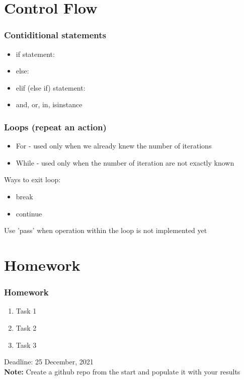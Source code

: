 \documentclass{beamer}
\begin{document}
\section{Control Flow} 

\begin{frame}
    \frametitle{Contiditional statements}
    \begin{itemize}
        \item if statement:
        \item else:
        \item elif (else if) statement:  
        \item and, or, in, isinstance
    \end{itemize}
\end{frame}

\begin{frame}
    \frametitle{Loops (repeat an action)}
    \begin{itemize}
        \item For - used only when we already knew the number of iterations
        \item While - used only when the number of iteration are not exactly known
    \end{itemize}

    Ways to exit loop:
    \begin{itemize}
        \item break
        \item continue
    \end{itemize}
    
    Use 'pass' when operation within the loop is not implemented yet
\end{frame}

\section{Homework} 

\begin{frame}
    \frametitle{Homework}
    \begin{enumerate}
        \item Task 1
        \item Task 2
        \item Task 3
    \end{enumerate}
    Deadline: 25 December, 2021 \\

\vfill
\textbf{Note:} Create a github repo from the start and populate it with your results
\end{frame}
\end{document}
